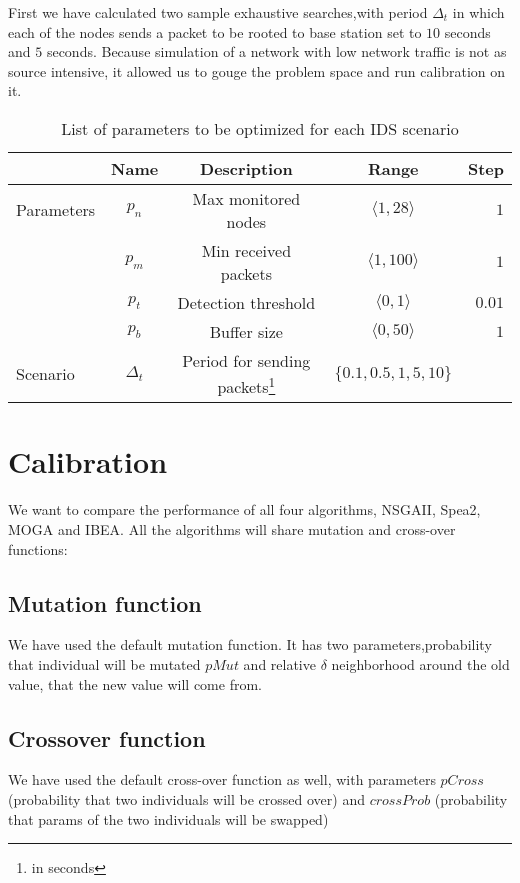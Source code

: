 \documentclass[12pt,oneside]{fithesis2}
\begin{document}
First we have calculated two sample exhaustive searches,with period $\Delta_t$ in which each of the nodes sends a packet to be rooted to base station set to $10$ seconds and $5$ seconds. Because simulation of a network with low network traffic is not as source intensive, it allowed us to gouge the problem space and run calibration on it.  

\begin{table}
  \centering
\begin{tabular}{ l c c c r}
  & Name & Description & Range & Step \\  
  \hline
  \hline                        
   Parameters & $p_n$ & Max monitored nodes & $\langle 1, 28 \rangle$ & $1$ \\
    & $p_m$ & Min received packets & $\langle 1, 100 \rangle$ & $1$ \\
    & $p_t$ & Detection threshold & $\langle 0, 1 \rangle$ & $0.01$ \\
    & $p_b$ & Buffer size & $\langle 0, 50 \rangle$ & $1$ \\
  \hline  
  \hline
  Scenario & $\Delta_t$ & Period for sending packets\footnote{in seconds} &  $\{ 0.1,0.5,1,5,10\}$  & \\
\end{tabular}
  \caption{List of parameters to be optimized for each IDS scenario}
  \label{tab:myfirsttable}
\end{table}

\section{Calibration}

We want to compare the performance of all four algorithms, NSGAII, Spea2, MOGA and IBEA. All the algorithms will share mutation and cross-over functions:

\subsection{Mutation function}
We have used the default mutation function. It has two parameters,probability that individual will be mutated $pMut$ and relative $\delta$ neighborhood around the old value, that the new value will come from.

\subsection{Crossover function}
We have used the default cross-over function as well, with parameters $pCross$ (probability that two individuals will be crossed over) and $crossProb$ (probability that params of the two individuals will be swapped)
\end{document}
